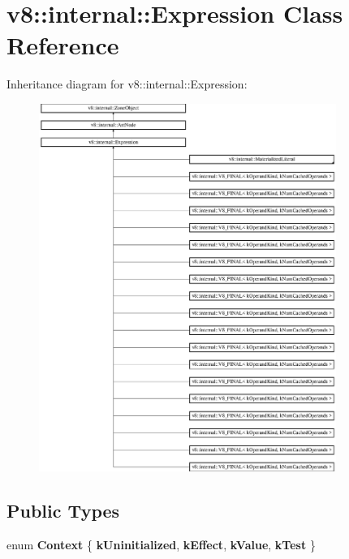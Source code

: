 \hypertarget{classv8_1_1internal_1_1_expression}{}\section{v8\+:\+:internal\+:\+:Expression Class Reference}
\label{classv8_1_1internal_1_1_expression}
Inheritance diagram for v8\+:\+:internal\+:\+:Expression\+:\begin{figure}[H]
\begin{center}
\leavevmode
\includegraphics[height=12.000000cm]{classv8_1_1internal_1_1_expression}
\end{center}
\end{figure}
\subsection*{Public Types}
\begin{DoxyCompactItemize}
\item 
\hypertarget{classv8_1_1internal_1_1_expression_a04f7abd80505ef4b9e813324d2fb37a9}{}enum {\bfseries Context} \{ {\bfseries k\+Uninitialized}, 
{\bfseries k\+Effect}, 
{\bfseries k\+Value}, 
{\bfseries k\+Test}
 \}\label{classv8_1_1internal_1_1_expression_a04f7abd80505ef4b9e813324d2fb37a9}

\end{DoxyCompactItemize}
